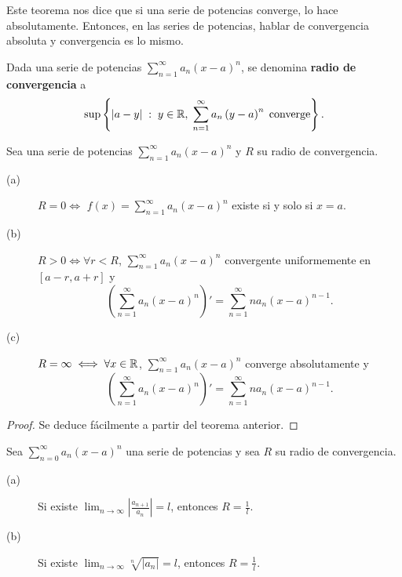 \begin{observation}
\normalfont Este teorema nos dice que si una serie de potencias converge, lo hace absolutamente. Entonces, en las series de potencias, hablar de convergencia absoluta y convergencia es lo mismo.
\end{observation}
\begin{fdefinition}
\normalfont Dada una serie de potencias $\displaystyle \sum^{\infty}_{n = 1}a_{n}\left(x-a\right)^{n} $, se denomina \textbf{radio de convergencia} a 
\[\sup \left\{ \left|a-y\right| \; : \; y \in \mathbb{R}, \; \sum^{\infty}_{n = 1}a_{n}\left(y-a\right)^{n} \; \text{converge}\right\}  .\]
\end{fdefinition}
\begin{ftheorem}[]
\normalfont Sea una serie de potencias $\displaystyle \sum^{\infty}_{n = 1}a_{n}\left(x-a\right)^{n} $ y $\displaystyle R $ su radio de convergencia.
\begin{description}
\item[(a)] $\displaystyle R = 0 \iff  $ $\displaystyle f\left(x\right) = \sum^{\infty}_{n = 1}a_{n}\left(x-a\right)^{n} $ existe si y solo si $\displaystyle x = a $.
\item[(b)] $\displaystyle  R > 0 \iff \forall r < R$, $\displaystyle \sum^{\infty}_{n = 1}a_{n}\left(x-a\right)^{n} $ convergente uniformemente en $\displaystyle \left[a - r, a + r\right]  $ y 
	\[ \left(\sum^{\infty}_{n = 1}a_{n}\left(x-a\right)^{n}\right)' = \sum^{\infty}_{n = 1}n a_{n}\left(x-a\right)^{n-1} .\]
\item[(c)] $\displaystyle R = \infty \iff \forall x \in \mathbb{R} $, $\displaystyle \sum^{\infty}_{ n=1}a_{n}\left(x-a\right)^{n} $ converge absolutamente y 
	\[ \left(\sum^{\infty}_{n = 1}a_{n}\left(x-a\right)^{n}\right)' = \sum^{\infty}_{n = 1}n a_{n}\left(x-a\right)^{n-1} .\]
\end{description}
\end{ftheorem}
\begin{proof}
Se deduce fácilmente a partir del teorema anterior.
\end{proof}
\begin{fcolorary}[]
\normalfont Sea $\displaystyle \sum^{\infty}_{n = 0}a_{n}\left(x-a\right)^{n} $ una serie de potencias y sea $\displaystyle R $ su radio de convergencia.
\begin{description}
\item[(a)] Si existe $\displaystyle \lim_{n \to \infty} \left|\frac{a_{n+1}}{a_{n}}\right| = l $, entonces $\displaystyle R = \frac{1}{l} $. 
\item[(b)] Si existe $\displaystyle \lim_{n \to \infty} \sqrt[n]{ \left|a_{n}\right|} = l$, entonces $\displaystyle R = \frac{1}{l} $.
\end{description}
\end{fcolorary}
